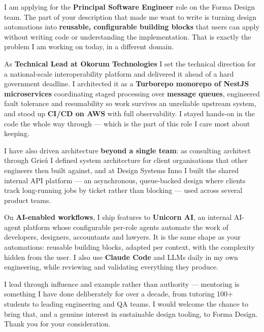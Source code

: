 \documentclass[11pt,a4paper]{awesome-cv}
\begin{document}
\makecvheader[R]
\makelettertitle

\begin{cvletter}

I am applying for the \textbf{Principal Software Engineer} role on the Forma Design team. The part of your description that made me want to write is turning design automations into \textbf{reusable, configurable building blocks} that users can apply without writing code or understanding the implementation. That is exactly the problem I am working on today, in a different domain.

As \textbf{Technical Lead at Okorum Technologies} I set the technical direction for a national-scale interoperability platform and delivered it ahead of a hard government deadline. I architected it as a \textbf{Turborepo monorepo of NestJS microservices} coordinating staged processing over \textbf{message queues}, engineered fault tolerance and resumability so work survives an unreliable upstream system, and stood up \textbf{CI/CD on AWS} with full observability. I stayed hands-on in the code the whole way through --- which is the part of this role I care most about keeping.

I have also driven architecture \textbf{beyond a single team}: as consulting architect through Grisú I defined system architecture for client organisations that other engineers then built against, and at Design Systems Inno I built the shared internal API platform --- an asynchronous, queue-backed design where clients track long-running jobs by ticket rather than blocking --- used across several product teams.

On \textbf{AI-enabled workflows}, I ship features to \textbf{Unicorn AI}, an internal AI-agent platform whose configurable per-role agents automate the work of developers, designers, accountants and lawyers. It is the same shape as your automations: reusable building blocks, adapted per context, with the complexity hidden from the user. I also use \textbf{Claude Code} and LLMs daily in my own engineering, while reviewing and validating everything they produce.

I lead through influence and example rather than authority --- mentoring is something I have done deliberately for over a decade, from tutoring 100+ students to leading engineering and QA teams. I would welcome the chance to bring that, and a genuine interest in sustainable design tooling, to Forma Design. Thank you for your consideration.

\end{cvletter}

\makeletterclosing
\end{document}
